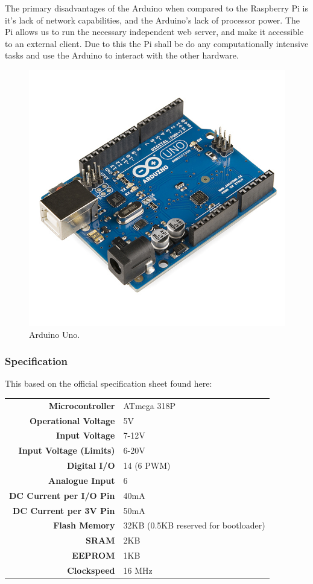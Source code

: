 \documentclass[12pt, a4paper]{article}
\begin{document}
The primary disadvantages of the Arduino when compared to the Raspberry Pi is
it's lack of network capabilities, and the Arduino's lack of processor power.
The Pi allows us to run the necessary independent web server, and make it
accessible to an external client. Due to this the Pi shall be do any
computationally intensive tasks and use the Arduino to interact with the other
hardware.

\begin{figure}[H]
    \centering
    \includegraphics[scale = 0.3]{images/arduino-uno}
    \caption{Arduino Uno.\cite{ArduinoImage}}
    \label{fig:arduino_uno}
\end{figure}

\newpage

\subsubsection{Specification}
This based on the official specification sheet found here\cite{Arduino}:

\begin{tabular}{>{\bfseries}r l}
	Microcontroller & ATmega 318P \\
	Operational Voltage & 5V \\
	Input Voltage & 7-12V \\
	Input Voltage (Limits) & 6-20V \\
	Digital I/O & 14 (6 PWM) \\
	Analogue Input & 6 \\
	DC Current per I/O Pin & 40mA \\
	DC Current per 3V Pin & 50mA \\
	Flash Memory & 32KB (0.5KB reserved for bootloader) \\
	SRAM & 2KB \\
	EEPROM & 1KB \\
	Clockspeed & 16 MHz \\
\end{tabular}
\end{document}
